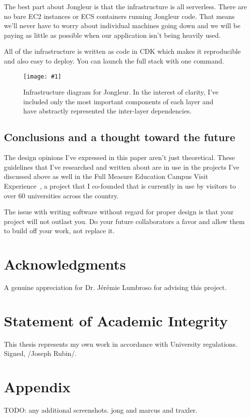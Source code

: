 \documentclass{article}
\newcommand{\screenshot}[2]{
  \begin{figure}[h]
    \texttt{[image: \#1]}
    \caption*{#2}
  \end{figure}
}
\begin{document}
The best part about Jongleur is that the infrastructure is all serverless.
There are no bare EC2 instances or ECS containers running Jongleur code.
That means we'll never have to worry about individual machines going down and we will be paying as little as possible when our application isn't being heavily used.

All of the infrastructure is written as code in CDK which makes it reproducible and also easy to deploy.
You can launch the full stack with one command.~\cite{jongleur}

\screenshot{jong-infra}{Infrastructure diagram for Jongleur. In the interest of clarity, I've included only the most important components of each layer and have abstractly represented the inter-layer dependencies.}

\subsection{Conclusions and a thought toward the future}

The design opinions I've expressed in this paper aren't just theoretical.
These guidelines that I've researched and written about are in use in the projects I've discussed above as well in the Full Measure Education Campus Visit Experience~\cite{cve}, a project that I co-founded that is currently in use by visitors to over $60$ universities across the country.

The issue with writing software without regard for proper design is that your project will not outlast you.
Do your future collaborators a favor and allow them to build off your work, not replace it.

\section{Acknowledgments}

A genuine appreciation for Dr. Jérémie Lumbroso for advising this project.

\section*{Statement of Academic Integrity}

This thesis represents my own work in accordance with University regulations.\\
Signed, /Joseph Rubin/.

%





\printindex

\section{Appendix}

TODO: any additional screenshots.
jong and marcus and traxler.
\end{document}
